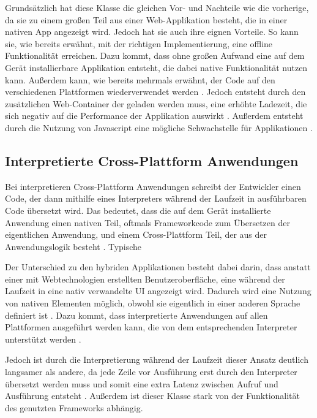 Grundsätzlich hat diese Klasse die gleichen Vor- und Nachteile wie die vorherige, da sie zu einem großen Teil aus einer Web-Applikation besteht, die in einer nativen App angezeigt wird. Jedoch hat sie auch ihre eignen Vorteile. So kann sie, wie bereits erwähnt, mit der richtigen Implementierung, eine offline Funktionalität erreichen. Dazu kommt, dass ohne großen Aufwand eine auf dem Gerät installierbare Applikation entsteht, die dabei native Funktionalität nutzen kann. Außerdem kann, wie bereits mehrmals erwähnt, der Code auf den verschiedenen Plattformen wiederverwendet werden \cite{IEEE_development_classes}. Jedoch entsteht durch den zusätzlichen Web-Container der geladen werden muss, eine erhöhte Ladezeit, die sich negativ auf die Performance der Applikation auswirkt \cite{IEEE_development_classes}. Außerdem entsteht durch die Nutzung von Javascript eine mögliche Schwachstelle für Applikationen \cite{javascript_dangerous}. 

\subsection{Interpretierte Cross-Plattform Anwendungen}
Bei interpretieren Cross-Plattform Anwendungen schreibt der Entwickler einen Code, der dann mithilfe eines Interpreters während der Laufzeit in ausführbaren Code übersetzt wird. Das bedeutet, dass die auf dem Gerät installierte Anwendung einen nativen Teil, oftmals Frameworkcode zum Übersetzen der eigentlichen Anwendung, und einem Cross-Plattform Teil, der aus der Anwendungslogik besteht \cite{IEEE_development_classes}. Typische 

Der Unterschied zu den hybriden Applikationen besteht dabei darin, dass anstatt einer mit Webtechnologien erstellten Benutzeroberfläche, eine während der Laufzeit in eine nativ verwandelte \ac{UI} angezeigt wird. Dadurch wird eine Nutzung von nativen Elementen möglich, obwohl sie eigentlich in einer anderen Sprache definiert ist \cite{IEEE_development_classes}. Dazu kommt, dass interpretierte Anwendungen auf allen Plattformen ausgeführt werden kann, die von dem entsprechenden Interpreter unterstützt werden \cite{server_side}.

Jedoch ist durch die Interpretierung während der Laufzeit dieser Ansatz deutlich langsamer als andere, da jede Zeile vor Ausführung erst durch den Interpreter übersetzt werden muss und somit eine extra Latenz zwischen Aufruf und Ausführung entsteht \cite{server_side}. Außerdem ist dieser Klasse stark von der Funktionalität des genutzten Frameworks abhängig.

